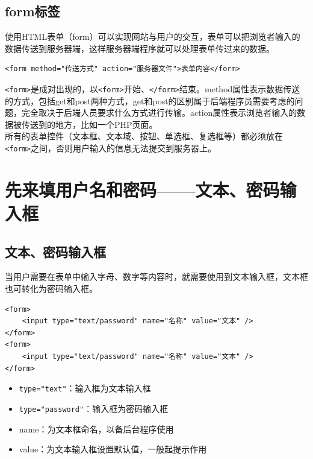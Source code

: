 \subsection{form标签}

使用HTML表单（form）可以实现网站与用户的交互，表单可以把浏览者输入的数据传送到服务器端，这样服务器端程序就可以处理表单传过来的数据。 \\

\begin{lstlisting}[style=htmlcssjs]
<form method="传送方式" action="服务器文件">表单内容</form>
\end{lstlisting}

\lstinline|<form>|是成对出现的，以\lstinline|<form>|开始、\lstinline|</form>|结束。method属性表示数据传送的方式，包括get和post两种方式，get和post的区别属于后端程序员需要考虑的问题，完全取决于后端人员要求什么方式进行传输。action属性表示浏览者输入的数据被传送到的地方，比如一个PHP页面。 \\

所有的表单控件（文本框、文本域、按钮、单选框、复选框等）都必须放在\lstinline|<form>|之间，否则用户输入的信息无法提交到服务器上。

\newpage

\section{先来填用户名和密码——文本、密码输入框}

\subsection{文本、密码输入框}

当用户需要在表单中输入字母、数字等内容时，就需要使用到文本输入框，文本框也可转化为密码输入框。 \\

\begin{lstlisting}[style=htmlcssjs]
<form>
    <input type="text/password" name="名称" value="文本" />
</form>
<form>
    <input type="text/password" name="名称" value="文本" />
</form>
\end{lstlisting}

\begin{itemize}
    \item \lstinline|type="text"|：输入框为文本输入框
    \item \lstinline|type="password"|：输入框为密码输入框
    \item name：为文本框命名，以备后台程序使用
    \item value：为文本输入框设置默认值，一般起提示作用
\end{itemize}

